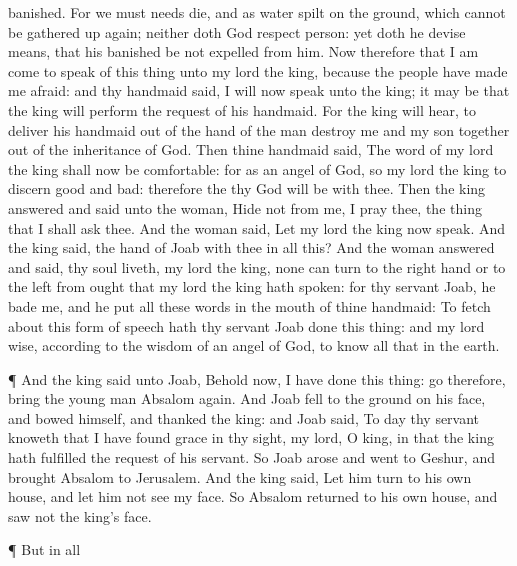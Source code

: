 {banished.
For we must
needs
die, and
{} as
water
spilt on the
ground, which cannot be gathered up
again; neither doth
God
respect
{}
person: yet doth he
devise
means, that his
banished be not
expelled from him.
Now therefore that I am
come to
speak of this
thing unto my
lord the
king,
{} because the
people have made me
afraid: and thy
handmaid
said, I will now
speak unto the
king; it may be that the
king will
perform the
request of his
handmaid.
For the
king will
hear, to
deliver his
handmaid out of the
hand of the
man
{}
destroy me and my
son
together out of the
inheritance of
God.
Then thine
handmaid
said, The
word of my
lord the
king shall now be
comfortable: for as an
angel of
God, so
{} my
lord the
king to
discern
good and
bad: therefore the
{} thy
God will be with thee.
Then the
king
answered and
said unto the
woman,
Hide not from me, I pray thee, the
thing that I shall
ask thee. And the
woman
said, Let my
lord the
king now
speak.
And the
king
said,
{} the
hand of
Joab with thee in all this? And the
woman
answered and
said,
{} thy
soul
liveth, my
lord the
king,
none
can turn to the right
hand or to the
left from ought that my
lord the
king hath
spoken: for thy
servant
Joab, he
bade me, and he
put all these
words in the
mouth of thine
handmaid:
To fetch
about this
form of
speech hath thy
servant
Joab
done this
thing: and my
lord
{}
wise, according to the
wisdom of an
angel of
God, to
know all
{} that
{} in the
earth.
\par }{\PP {}¶ And the
king
said unto
Joab, Behold now, I have
done this
thing:
go therefore,
bring the young
man
Absalom
again.
And
Joab
fell to the
ground on his
face, and
bowed himself, and
thanked the
king: and
Joab
said, To
day thy
servant
knoweth that I have
found
grace in thy
sight, my
lord, O
king, in that the
king hath
fulfilled the
request of his
servant.
So
Joab
arose and
went to
Geshur, and
brought
Absalom to
Jerusalem.
And the
king
said, Let him
turn to his own
house, and let him not
see my
face. So
Absalom
returned to his own
house, and
saw not the
king’s
face.
\par }{\PP {}¶ But in all
}
